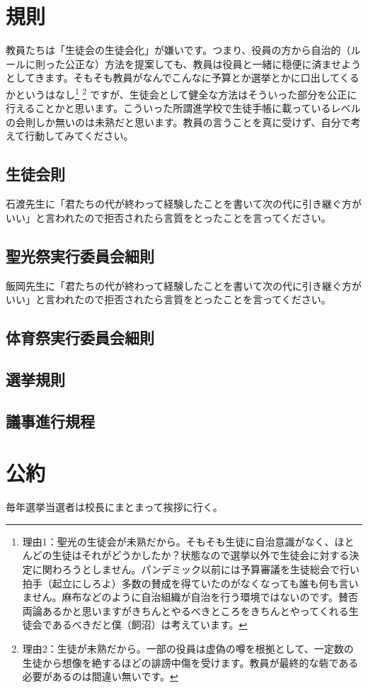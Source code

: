 \documentclass[dvipdfmx,jb5]{jreport}
\begin{document}
\section{規則}
教員たちは「生徒会の生徒会化」が嫌いです。つまり、役員の方から自治的（ルールに則った公正な）方法を提案しても、教員は役員と一緒に穏便に済ませようとしてきます。そもそも教員がなんでこんなに予算とか選挙とかに口出してくるかというはなし\footnote{理由1：聖光の生徒会が未熟だから。そもそも生徒に自治意識がなく、ほとんどの生徒はそれがどうかしたか？状態なので選挙以外で生徒会に対する決定に関わろうとしません。パンデミック以前には予算審議を生徒総会で行い拍手（起立にしろよ）多数の賛成を得ていたのがなくなっても誰も何も言いません。麻布などのように自治組織が自治を行う環境ではないのです。賛否両論あるかと思いますがきちんとやるべきところをきちんとやってくれる生徒会であるべきだと僕（飼沼）は考えています。} \footnote{理由2：生徒が未熟だから。一部の役員は虚偽の噂を根拠として、一定数の生徒から想像を絶するほどの誹謗中傷を受けます。教員が最終的な砦である必要があるのは間違い無いです。} ですが、生徒会として健全な方法はそういった部分を公正に行えることかと思います。こういった所謂進学校で生徒手帳に載っているレベルの会則しか無いのは未熟だと思います。教員の言うことを真に受けず、自分で考えて行動してみてください。
\subsection{生徒会則}
石渡先生に「君たちの代が終わって経験したことを書いて次の代に引き継ぐ方がいい」と言われたので拒否されたら言質をとったことを言ってください。
\subsection{聖光祭実行委員会細則}
飯岡先生に「君たちの代が終わって経験したことを書いて次の代に引き継ぐ方がいい」と言われたので拒否されたら言質をとったことを言ってください。
\subsection{体育祭実行委員会細則}
\subsection{選挙規則}
\subsection{議事進行規程}
\section{公約}
毎年選挙当選者は校長にまとまって挨拶に行く。
\end{document}
